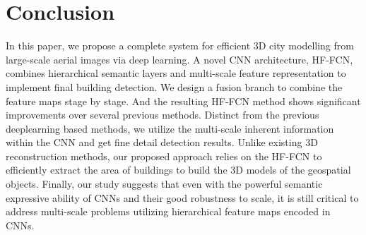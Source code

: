 \section{Conclusion}
\label{Sec:Con}
 In this paper, we propose a complete system for efficient 3D city modelling from large-scale aerial images via deep learning. A novel CNN architecture, HF-FCN, combines hierarchical semantic layers and multi-scale feature representation to implement final building detection. We design a fusion branch to combine the feature maps stage by stage. And the resulting HF-FCN method shows significant improvements over several previous methods. Distinct from the previous deeplearning based methods, we utilize the multi-scale inherent information within the CNN and get fine detail detection results. Unlike existing 3D  reconstruction methods, our proposed approach relies on the HF-FCN to efficiently extract the area of buildings to build the 3D models of the geospatial objects. Finally, our study suggests that even with the powerful semantic expressive ability of CNNs and their good robustness to scale, it is still critical to address multi-scale problems utilizing hierarchical feature maps encoded in CNNs.

